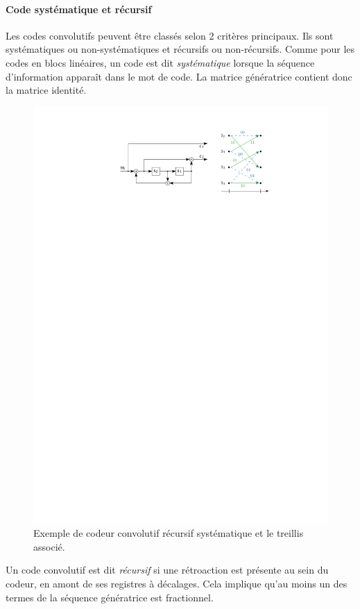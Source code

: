 \paragraph*{Code systématique et récursif}
Les codes convolutifs peuvent être classés selon 2 critères principaux. Ils sont systématiques ou non-systématiques et récursifs ou non-récursifs. 
Comme pour les codes en blocs linéaires, un code est dit \emph{systématique} lorsque la séquence 
d'information apparaît dans le mot de code. La matrice génératrice contient donc la matrice identité. 
\begin{figure}[!b]
	\centering
	\includegraphics[width=12cm]{main/ch1_fig/encRSC.pdf}
	\caption{\label{fig:encRSC} Exemple de codeur convolutif récursif systématique et le treillis associé.}
\end{figure}

Un code convolutif est dit \emph{récursif} si une rétroaction est présente au sein du codeur, en amont de ses registres à décalages. Cela 
implique qu'au moins un des termes de la séquence génératrice est fractionnel. 

